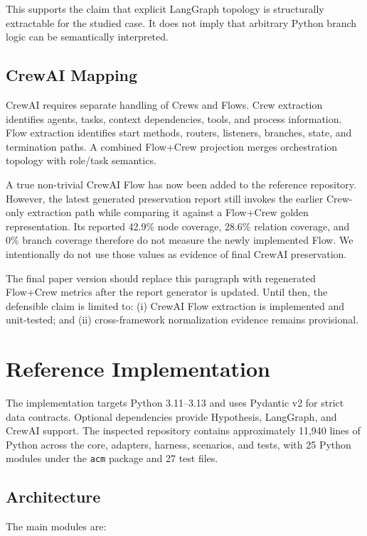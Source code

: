 \documentclass[10pt]{article}
\begin{document}
This supports the claim that explicit LangGraph topology is structurally extractable for the studied case. It does not imply that arbitrary Python branch logic can be semantically interpreted.

\subsection{CrewAI Mapping}

CrewAI requires separate handling of Crews and Flows. Crew extraction identifies agents, tasks, context dependencies, tools, and process information. Flow extraction identifies start methods, routers, listeners, branches, state, and termination paths. A combined Flow+Crew projection merges orchestration topology with role/task semantics.

A true non-trivial CrewAI Flow has now been added to the reference repository. However, the latest generated preservation report still invokes the earlier Crew-only extraction path while comparing it against a Flow+Crew golden representation. Its reported 42.9\% node coverage, 28.6\% relation coverage, and 0\% branch coverage therefore do not measure the newly implemented Flow. We intentionally do not use those values as evidence of final CrewAI preservation.

The final paper version should replace this paragraph with regenerated Flow+Crew metrics after the report generator is updated. Until then, the defensible claim is limited to: (i) CrewAI Flow extraction is implemented and unit-tested; and (ii) cross-framework normalization evidence remains provisional.

\section{Reference Implementation}
\label{sec:implementation}

The implementation targets Python 3.11--3.13 and uses Pydantic v2 for strict data contracts. Optional dependencies provide Hypothesis, LangGraph, and CrewAI support. The inspected repository contains approximately 11,940 lines of Python across the core, adapters, harness, scenarios, and tests, with 25 Python modules under the \texttt{acm} package and 27 test files.

\subsection{Architecture}

The main modules are:
\end{document}
